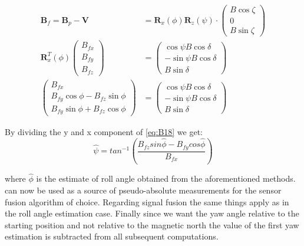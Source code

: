 \begin{align}
    \boldsymbol{B}_f = \boldsymbol{B}_p-\boldsymbol{V} &= \boldsymbol{R}_x(\phi)\boldsymbol{R}_z(\psi)\cdot \left(\begin{array}{c}{B\cos \zeta} \\ {0} \\ {B\sin \zeta}\end{array}\right)  \\
    \boldsymbol{R}^T_x(\phi)\left(\begin{array}{c}{B_{fx}} \\ {B_{fy}} \\ {B_{fz}}\end{array}\right)   &= \left(\begin{array}{c}{\cos \psi B \cos \delta} \\ {-\sin \psi B \cos \delta} \\ {B \sin \delta}\end{array}\right) \\
    \left(\begin{array}{c}{B_{f x} } \\ {B_{f y} \cos \phi-B_{f z} \sin \phi} \\ {B_{f y} \sin \phi+ B_{f z}  \cos \phi}\end{array}\right) &= \left(\begin{array}{c}{\cos \psi B \cos \delta} \\ {-\sin \psi B \cos \delta} \\ {B \sin \delta}\end{array}\right) \label{eq:B18}
\end{align}

By dividing the y and x component of  \cref{eq:B18} we get:
\begin{equation}
    \hat{\psi}=tan^{-1}\left(\frac{B_{f z}sin\hat{\phi}-B_{f y}cos\hat{\phi}}{B_{f x}}\right)
    \label{eq:psiMag}
\end{equation} 

where \ensuremath{\hat{\phi}} is the estimate of roll angle obtained from the aforementioned methods.  can now be used as a source of pseudo-absolute measurements for the sensor fusion algorithm of choice. Regarding signal fusion the same things apply as in the roll angle estimation case. Finally since we want the yaw angle relative to the starting position and not relative to the magnetic north the value of the first yaw estimation is subtracted from all subsequent computations.


